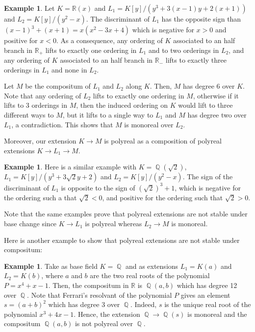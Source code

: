 \documentclass[12pt]{amsart}
\theoremstyle{definition}
\newtheorem{ex}[thm]{Example}
\DeclareMathOperator{\QQ}{\mathbb Q}
\def \RR {{\mathbb R}}
\begin{document}
\begin{ex}\label{VsPolyCompose}
Let $K=\RR(x)$ and $L_1=K[y]/(y^3+3(x-1)y+2(x+1))$ and
$L_2=K[y]/(y^2-x)$. The discriminant of $L_1$ has the opposite sign than $(x-1)^3+(x+1)=x(x^2-3x+4)$ which is negative for $x>0$ and positive for $x<0$.
As a consequence, any ordering of $K$ associated to an half branch in $\RR_+$ lifts to exactly one ordering in $L_1$ and to two orderings in $L_2$, and any ordering of $K$ associated to an half branch in $\RR_-$ lifts to exactly three orderings in $L_1$ and none in $L_2$. 

Let $M$ be the compositum of $L_1$ and $L_2$ along $K$. Then, $M$ has degree 6 over $K$.
Note that any ordering of $L_2$ lifts to exactly one ordering in $M$, otherwise if it lifts to 3 orderings in $M$, then the induced ordering on $K$ would lift to three different ways to $M$, but it lifts to a single way to $L_1$ and $M$ has degree two over $L_1$, a contradiction.
This shows that $M$ is monoreal over $L_2$.

Moreover, our extension $K\to M$ is polyreal as a composition of polyreal extensions $K\to L_1\to M$. 
\end{ex}
	
\begin{ex}
	Here is a similar example with $K=\QQ(\sqrt{2})$,
	$L_1=K[y]/(y^3+3\sqrt{2}y+2)$ and
	$L_2=K[y]/(y^2-x)$. The sign of the discriminant of $L_1$ is opposite to the sign of $(\sqrt{2})^3+1$, which is negative for the ordering such a that $\sqrt{2}<0$, and positive for
	the ordering such that $\sqrt{2}>0$.
\end{ex}

Note that the same examples prove that polyreal extensions are not stable under base change since $K\to L_1$ is polyreal whereas $L_2\to M$ is monoreal.



Here is another example to show that polyreal extensions are not stable under compositum:

\begin{ex} 	Take as base field $K=\QQ$ and as extensions $L_1=K(a)$ and $L_2=K(b)$, where $a$ and $b$ are the two real roots of the polynomial $P=x^4+x-1$. Then, the compositum in $\RR$
is $\QQ(a,b)$ which has degree 12 over $\QQ$. Note that Ferrari's resolvant of the polynomial $P$ gives an element $s=(a+b)^2$ which has degree 3 over $\QQ$. Indeed, $s$ is the unique real root of the polynomial $x^3+4x-1$. Hence, the extension $\QQ\to \QQ(s)$ is monoreal and the compositum $\QQ(a,b)$ is not polyreal over $\QQ$. \end{ex}
\end{document}
